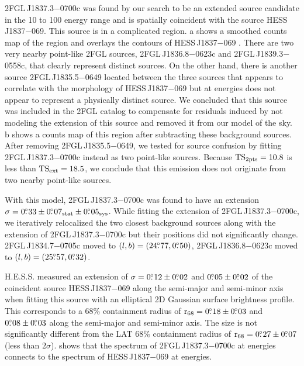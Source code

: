 2FGL\,J1837.3$-$0700c was found by our search to be an extended source
candidate in the 10 \gev to 100 \gev energy range and is spatially
coincident with the \tev source HESS\,J1837$-$069.  This source is
in a complicated region.  a shows a
smoothed counts map of the region and overlays the \tev contours of
HESS\,J1837$-$069 \citep{aharonian_2006_h.e.s.s.-survey}.  There are two very nearby
point-like 2FGL sources, 2FGL\,J1836.8$-$0623c and 2FGL\,J1839.3$-$0558c,
that clearly represent distinct sources.  On the other hand, there is
another source 2FGL\,J1835.5$-$0649 located between the three sources that
appears to correlate with the \tev morphology of HESS\,J1837$-$069 but
at \gev energies
does not appear to represent a physically distinct source.  We concluded
that this source was included in the 2FGL catalog to compensate for residuals induced by
not modeling the extension of this source and removed it from our model
of the sky.  b shows a
counts map of this region after subtracting these background sources.
After removing 2FGL\,J1835.5$-$0649,
we tested for
source confusion by fitting 
2FGL\,J1837.3$-$0700c
instead as two point-like sources.
Because $\mathrm{TS}_{\mathrm{2pts}}=10.8$ is less than $\mathrm{TS}_\mathrm{ext}=18.5$, we conclude that this emission
does not originate from two nearby point-like sources.

With this model, 2FGL\,J1837.3$-$0700c was found to have an
extension $\sigma=0\mbox{$.\!\!^\circ$}33\pm0\mbox{$.\!\!^\circ$}07_\text{stat}\pm0\mbox{$.\!\!^\circ$}05_\text{sys}$.
While fitting the extension of 2FGL\,J1837.3$-$0700c,
we iteratively relocalized the two closest
background sources along with the extension of 2FGL\,J1837.3$-$0700c but
their positions did not significantly change.  2FGL\,J1834.7$-$0705c
moved to $(l,b)=(24\mbox{$.\!\!^\circ$}77,0\mbox{$.\!\!^\circ$}50)$, 2FGL\,J1836.8$-$0623c moved
to $(l,b)=(25\mbox{$.\!\!^\circ$}57,0\mbox{$.\!\!^\circ$}32)$. 

H.E.S.S. measured an extension of
$\sigma=0\mbox{$.\!\!^\circ$}12\pm0\mbox{$.\!\!^\circ$}02$ and $0\mbox{$.\!\!^\circ$}05\pm0\mbox{$.\!\!^\circ$}02$ 
of the coincident \tev source HESS\,J1837$-$069 
along the semi-major and semi-minor axis when fitting this source
with an elliptical 2D Gaussian surface brightness profile.  This corresponds
to a 68\% containment radius of ${\mathrm{r}_{68}}=0\mbox{$.\!\!^\circ$}18\pm0\mbox{$.\!\!^\circ$}03$ and
$0\mbox{$.\!\!^\circ$}08\pm0\mbox{$.\!\!^\circ$}03$ along the semi-major and semi-minor axis. The
size is not significantly different from the LAT 68\% containment
radius of ${\mathrm{r}_{68}}=0\mbox{$.\!\!^\circ$}27\pm0\mbox{$.\!\!^\circ$}07$ (less than $2\sigma$).
 shows that the spectrum of 2FGL\,J1837.3$-$0700c
at \gev energies connects to the spectrum of HESS\,J1837$-$069 at \tev
energies.

